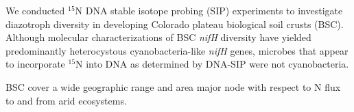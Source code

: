 We conducted $^{15}$N DNA stable isotope probing (SIP) experiments to investigate diazotroph diversity in developing Colorado plateau biological soil crusts (BSC). Although molecular characterizations of BSC \textit{nifH} diversity have yielded predominantly heterocystous cyanobacteria-like \textit{nifH} genes, microbes that appear to incorporate $^{15}$N into DNA as determined by DNA-SIP were not cyanobacteria.

BSC cover a wide geographic range and area major node with respect to N flux to and from arid ecosystems.


